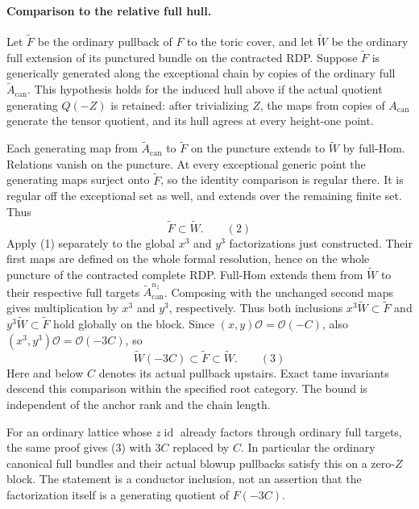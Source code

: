 \paragraph{Comparison to the relative full hull.}
Let $\widetilde F$ be the ordinary pullback of $F$ to the toric cover,
and let $\widetilde W$ be the ordinary full extension of its punctured
bundle on the contracted RDP. Suppose $\widetilde F$ is generically
generated along the exceptional chain by copies of the ordinary full
$\widetilde A_{\mathrm{can}}$. This hypothesis holds for the induced
hull above if the actual quotient generating $Q(-Z)$ is retained:
after trivializing $Z$, the maps from copies of $A_{\mathrm{can}}$
generate the tensor quotient, and its hull agrees at every height-one
point.

Each generating map from $\widetilde A_{\mathrm{can}}$ to
$\widetilde F$ on the puncture extends to $\widetilde W$ by full-Hom.
Relations vanish on the puncture. At every exceptional generic point
the generating maps surject onto $\widetilde F$, so the identity
comparison is regular there. It is regular off the exceptional set as
well, and extends over the remaining finite set. Thus
\[
                         \widetilde F\subset\widetilde W. \qquad(2)
\]
Apply (1) separately to the global $x^3$ and $y^3$
factorizations just constructed. Their first maps are defined on the
whole formal resolution, hence on the whole puncture of the contracted
complete RDP. Full-Hom extends them from $\widetilde W$ to their
respective full targets $\widetilde A_{\mathrm{can}}^{n_z}$.
Composing with the unchanged second maps gives multiplication by
$x^3$ and $y^3$, respectively. Thus both inclusions
$x^3\widetilde W\subset\widetilde F$ and
$y^3\widetilde W\subset\widetilde F$ hold globally on the block. Since
$(x,y)\mathcal O=\mathcal O(-C)$, also
$(x^3,y^3)\mathcal O=\mathcal O(-3C)$, so
\[
           \widetilde W(-3C)\subset\widetilde F
                                      \subset\widetilde W. \qquad(3)
\]
Here and below $C$ denotes its actual pullback upstairs. Exact tame
invariants descend this comparison within the specified root category.
The bound is independent of the anchor rank and the chain length.

For an ordinary lattice whose $z\operatorname{id}$ already factors
through ordinary full targets, the same proof gives (3) with $3C$
replaced by $C$. In particular the ordinary canonical full bundles
and their actual blowup pullbacks satisfy this on a zero-$Z$ block.
The statement is a conductor inclusion, not an assertion that the
factorization itself is a generating quotient of $F(-3C)$.

